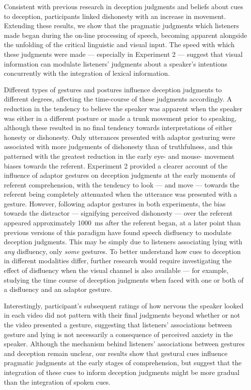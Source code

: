 \documentclass[a4paper,man,natbib]{apa6}
\begin{document}
Consistent with previous research in deception judgments and beliefs about cues to deception, participants linked dishonesty with an increase in movement. %
Extending these results, we show that the pragmatic judgments which listeners made began during the on-line processing of speech, becoming apparent alongside the unfolding of the critical linguistic and visual input.
The speed with which these judgments were made --- especially in Experiment 2 --- suggest that visual information can modulate listeners' judgments about a speaker's intentions concurrently with the integration of lexical information.

Different types of gestures and postures influence deception judgments to different degrees, affecting the time-course of these judgments accordingly. 
A reduction in the tendency to believe the speaker was apparent when the speaker was either in a different posture or made a trunk movement prior to speaking, although these resulted in no final tendency towards interpretations of either honesty or dishonesty. 
Only utterances presented with adaptor gesturing were associated with more judgements of dishonesty than of truthfulness, and this patterned with the greatest reduction in the early eye- and mouse- movement biases towards the referent. 
Experiment 2 provided a clearer account of the influence of adaptor gestures on deception judgments at the early moments of referent comprehension, with the tendency to look --- and move --- towards the referent being completely attenuated when the utterance was presented with a gesture. 
However, following adaptor gestures in both experiments, the bias towards the distractor --- signifying perceived dishonesty --- over the referent appeared approximately 1000~ms after the referent began, at a later point than previous versions of this paradigm have found speech disfluency to modulate deception judgments.
This may be simply due to listeners associating lying with \textit{any} disfluency, only \textit{some} gestures.
To better understand how cues to deception in different modalities differ, further research would require investigating the effect of disfluency when the visual channel is also available --- for example, studying the time course of deception judgments when faced with one or both of a disfluency and an adaptor gesture. %

Interestingly, participant's subsequent ratings of how nervous the speaker looked in each video did not pattern with their final judgments beyond whether or not the video presented a gesture, suggesting that listeners' associations between gesture and lying is not necessarily a consequence of perceived anxiety in the speaker.
Although the mechanism behind listeners' associations between gestures and deception remain unclear, our results show that gestural cues influence pragmatic judgments at the early stages of comprehension, but suggest that the integration of these cues to inform deception judgments might be more gradual than the integration of spoken cues.




\end{document}
